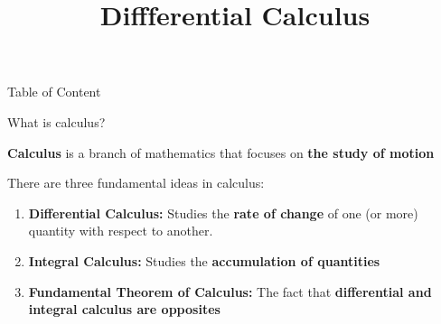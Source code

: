 \documentclass[9pt]{beamer}
\title{\Huge Diffferential Calculus}
\begin{document}
\maketitle

\begin{frame}{Table of Content} 
    \tableofcontents
\end{frame}


\begin{frame}{What is calculus?}
    
    \textbf{Calculus} is a branch of mathematics that focuses on \textbf{the study of motion} %
    \vspace{0.5cm}
    
    
    There are three fundamental ideas in calculus:
    \vspace{0.2cm}

    \begin{enumerate}[leftmargin = 0.5cm, label = \arabic*, rightmargin = 0.2cm]
    
    \item \textbf{Differential Calculus:} Studies the \textbf{rate of change} of one (or more) quantity with respect to another. %
    \vspace{0.1cm}

    \item \textbf{Integral Calculus:} Studies the \textbf{accumulation of quantities}
    \vspace{0.1cm}

    \item \textbf{Fundamental Theorem of Calculus:} The fact that \textbf{differential and integral calculus are opposites}
    \end{enumerate}
    
\end{frame}
\end{document}
